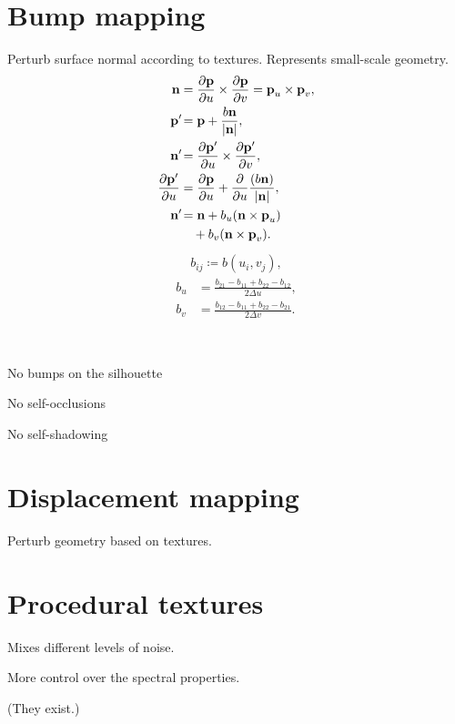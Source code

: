 \begin{compactdesc}
\section{Bump mapping}
Perturb surface normal according to textures. Represents small-scale geometry.
	\begin{align*}
		\bm{\mathrm{n}}&=\frac{\partial \bm{\mathrm{p}}}{\partial u}\times\frac{\partial \bm{\mathrm{p}}}{\partial v}=\bm{\mathrm{p}}_{u}\times\bm{\mathrm{p}}_{v},\\
		\bm{\mathrm{p}}'\!&=\bm{\mathrm{p}}+\frac{b\bm{\mathrm{n}}}{\left\lvert \bm{\mathrm{n}} \right\rvert},\\
		\bm{\mathrm{n}}'\!&=\frac{\partial \bm{\mathrm{p}}'}{\partial u}\times\frac{\partial \bm{\mathrm{p}}'}{\partial v},\\
		\frac{\partial \bm{\mathrm{p}}'}{\partial u}&=\frac{\partial \bm{\mathrm{p}}}{\partial u}+\frac{\partial }{\partial u}\frac{(b\bm{\mathrm{n}})}{\left\lvert \bm{\mathrm{n}} \right\rvert},\\
		\bm{\mathrm{n}}'\!&=\bm{\mathrm{n}}+b_u(\bm{\mathrm{n}}\times\bm{\mathrm{p}}_u)\\
		&\quad+b_v(\bm{\mathrm{n}}\times\bm{\mathrm{p}}_v).
	\end{align*}
	\begin{gather*}
		b_{ij}\coloneqq b(u_i,v_j),
	\end{gather*}
	\begin{align*}
		b_u&=\frac{b_{21}-b_{11}+b_{22}-b_{12}}{2\Delta u},\\
		b_v&=\frac{b_{12}-b_{11}+b_{22}-b_{21}}{2\Delta v}.
	\end{align*}
\item[\lp{Limitations}] \hfill\\
	\begin{enumerate*}[label=\protect\circled{\arabic*},itemjoin=]
		\item No bumps on the silhouette\\
		\item No self-occlusions\\
		\item No self-shadowing
	\end{enumerate*}
\section{Displacement mapping}
Perturb geometry based on textures.
\section{Procedural textures}
	\item[\lp{Perlin Noise}] Mixes different levels of noise.
	\item[\lp{Gabor noise}] More control over the spectral properties.
	\item[\lp{3D textures}](They exist.)\\

\end{compactdesc}
